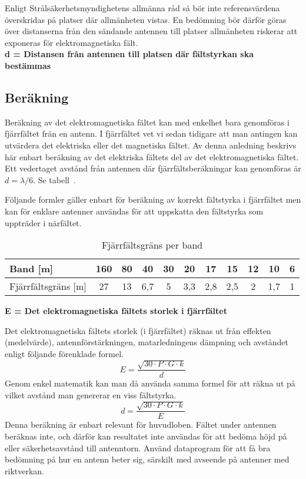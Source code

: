 Enligt Strålsäkerhetsmyndighetens allmänna råd så bör inte referensvärdena
överskridas på platser där allmänheten vistas.
En bedömning bör därför göras över distanserna från den sändande antennen till
platser allmänheten riskerar att exponeras för elektromagnetiska fält.
\\[1ex] %
\noindent\textbf{d = Distansen från antennen till platsen där fältstyrkan ska bestämmas}

\subsection{Beräkning}

Beräkning av det elektromagnetiska fältet kan med enkelhet bara
genomföras i fjärrfältet från en antenn.
I fjärrfältet vet vi sedan tidigare att man antingen kan utvärdera det
elektriska eller det magnetiska fältet.
Av denna anledning beskrivs här enbart beräkning av det elektriska fältets del av
det elektromagnetiska fältet.
Ett vedertaget avstånd från antennen där fjärrfältsberäkningar kan genomföras
är
\(d=\lambda / 6\). Se tabell~.

Följande formler gäller enbart för beräkning av korrekt fältstyrka i
fjärrfältet men kan för enklare antenner användas för att uppskatta den
fältstyrka som uppträder i närfältet.

\begin{table*}[ht]
  \begin{center}
    \begin{tabular}{|l|c|c|c|c|c|c|c|c|c|c|}
	\hline
	Band [m] & 160 & 80 & 40 & 30 & 20 & 17 & 15 & 12 & 10 & 6 \\ \hline
	Fjärrfältsgräns [m] & 27 & 13 & 6,7 & 5 & 3,3 & 2,8 & 2,5 & 2 & 1,7 & 1 \\ \hline
    \end{tabular}
    \caption{Fjärrfältsgräns per band}
    \label{tab:fjfltgr}
  \end{center}
\end{table*}

\noindent\textbf{E = Det elektromagnetiska fältets storlek i fjärrfältet}

Det elektromagnetiska fältets storlek (i fjärrfältet) räknas ut från
effekten (medelvärde), antennförstärkningen, matarledningens dämpning
och avståndet enligt följande förenklade formel.
\[E=\dfrac{\sqrt{30 \cdot P \cdot G \cdot k}}{d}\]
Genom enkel matematik kan man då använda samma formel för att räkna
ut på vilket avstånd man genererar en viss fältstyrka.
\[d=\dfrac{\sqrt{30 \cdot P \cdot G \cdot k}}{E}\]
Denna beräkning är enbart relevant för huvudloben.
Fältet under antennen beräknas inte, och därför kan resultatet inte användas
för att bedöma höjd på eller säkerhetsavstånd till antenntorn.
Använd dataprogram för att få bra bedömning på hur en antenn beter sig,
särskilt med avseende på antenner med riktverkan.

